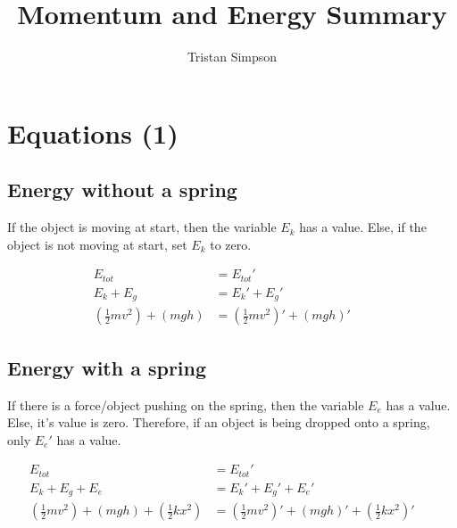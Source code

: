 \documentclass{article}
\title{Momentum and Energy Summary}
\author{Tristan Simpson}
\begin{document}
\maketitle

\section{Equations (1)}
\begin{adjustwidth}{1cm}{0pt}
    \subsection*{Energy without a spring}
    \begin{flushleft}
        If the object is moving at start, then the variable $E_{k}$ has a value. Else, if the object is not moving at start, set $E_{k}$ to zero.
    \end{flushleft}
    \begin{align*}
        E_{tot}                   & = E_{tot}\prime                              \\
        E_{k} + E_{g}             & = E_{k}\prime + E_{g}\prime                  \\
        (\frac{1}{2}mv^2) + (mgh) & = (\frac{1}{2}mv^2)\prime + (mgh)\prime &  &
    \end{align*}
    \vspace*{0.03cm}
    \subsection*{Energy with a spring}
    \begin{flushleft}
        If there is a force/object pushing on the spring, then the variable $E_{e}$ has a value. Else, it's value is zero. Therefore, if an object is being dropped onto a spring, only $E_{e}\prime$ has a value.
    \end{flushleft}
    \begin{align*}
        E_{tot}                                       & = E_{tot}\prime                                                        \\
        E_{k} + E_{g}     + E_{e}                     & = E_{k}\prime + E_{g}\prime  + E_{e}\prime                             \\
        (\frac{1}{2}mv^2) + (mgh) + (\frac{1}{2}kx^2) & = (\frac{1}{2}mv^2)\prime + (mgh)\prime + (\frac{1}{2}kx^2)\prime &  &
    \end{align*}
    \vspace*{0.03cm}

\end{adjustwidth}
\end{document}
